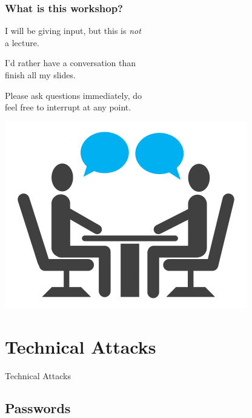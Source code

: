 \documentclass[aspectratio=1610,dvipsnames]{beamer}
\begin{document}
\begin{frame}
\frametitle{What is this workshop?}

\begin{minipage}{0.5\textwidth}
I will be giving input, but this is \emph{not}\\ a lecture.
\bigskip

I'd rather have a conversation than\\ finish all my slides.
\bigskip

Please ask questions immediately, do\\ feel free to interrupt at any point.
\end{minipage}%
\begin{minipage}{0.5\textwidth}
\begin{center}
\includegraphics[scale=0.6,keepaspectratio]{images/conversation.png} 
\end{center}
\end{minipage}
\end{frame}


\section{Technical Attacks}
\begin{frame}
\begin{center}
\huge Technical Attacks\normalsize
\end{center}
\end{frame}

\subsection{Passwords}
\end{document}
